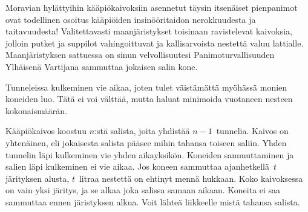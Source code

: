 
\noindent

Moravian hylättyihin kääpiökaivoksiin asennetut täysin itsenäiset pienpanimot ovat todellinen osoitus kääpiöiden insinööritaidon nerokkuudesta ja taitavuudesta!
Valitettavasti maanjäristykset toisinaan ravistelevat kaivoksia, jolloin putket ja suppilot vahingoittuvat ja kallisarvoista nestettä valuu lattialle.
Maanjäristyksen sattuessa on sinun velvollisuutesi Panimoturvallisuuden Ylhäisenä Vartijana sammuttaa jokaisen salin kone.


Tunneleissa kulkeminen vie aikaa,
joten tulet väistämättä myöhässä monien koneiden luo.
Tätä ei voi välttää, mutta haluat minimoida vuotaneen nesteen kokonaismäärän.

\medskip
Kääpiökaivos koostuu $n$:stä salista, joita yhdistää $n-1$~tunnelia.
Kaivos on yhtenäinen, eli jokaisesta salista pääsee mihin tahansa toiseen saliin.
Yhden tunnelin läpi kulkeminen vie yhden aikayksikön.
Koneiden sammuttaminen ja salien läpi kulkeminen ei vie aikaa.
Jos koneen sammuttaa ajanhetkellä~$t$ järityksen alusta, $t$~litraa nestettä on ehtinyt mennä hukkaan.
Koko kaivoksessa on vain yksi järitys, ja se alkaa joka salissa samaan aikaan. Koneita ei saa sammuttaa ennen järistyksen alkua.
Voit lähteä liikkeelle mistä tahansa salista.

